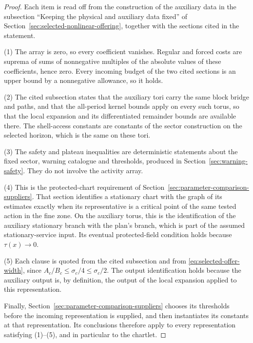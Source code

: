 \begin{proof}
Each item is read off from the construction of the auxiliary data in
the subsection ``Keeping the physical and auxiliary data fixed'' of
Section~\ref{sec:selected-nonlinear-offering}, together with the
sections cited in the statement.

(1) The array is zero, so every coefficient vanishes. Regular and
forced costs are suprema of sums of nonnegative multiples of the
absolute values of these coefficients, hence zero. Every incoming
budget of the two cited sections is an upper bound by a nonnegative
allowance, so it holds.

(2) The cited subsection states that the auxiliary tori carry the same
block bridge and paths, and that the all-period kernel bounds apply on
every such torus, so that the local expansion and its differentiated
remainder bounds are available there. The shell-access constants are
constants of the sector construction on the selected horizon, which is
the same on these tori.

(3) The safety and plateau inequalities are deterministic statements
about the fixed sector, warning catalogue and thresholds, produced in
Section~\ref{sec:warning-safety}. They do not involve the activity
array.

(4) This is the protected-chart requirement of
Section~\ref{sec:parameter-comparison-suppliers}. That section
identifies a stationary chart with the graph of its estimates exactly
when its representative is a critical point of the same tested action
in the fine zone. On the auxiliary torus, this is the identification of
the auxiliary stationary branch with the plan's branch, which is part
of the assumed stationary-service input. Its eventual protected-field
condition holds because $\tau(x)\to0$.

(5) Each clause is quoted from the cited subsection and from
\eqref{eq:selected-offer-width}, since
$A_c/B_c\le\sigma_c/4\le\sigma_c/2$. The output identification holds
because the auxiliary output is, by definition, the output of the local
expansion applied to this representation.

Finally, Section~\ref{sec:parameter-comparison-suppliers} chooses its
thresholds before the incoming representation is supplied, and then
instantiates its constants at that representation. Its conclusions
therefore apply to every representation satisfying (1)--(5), and in
particular to the chartlet.
\end{proof}

